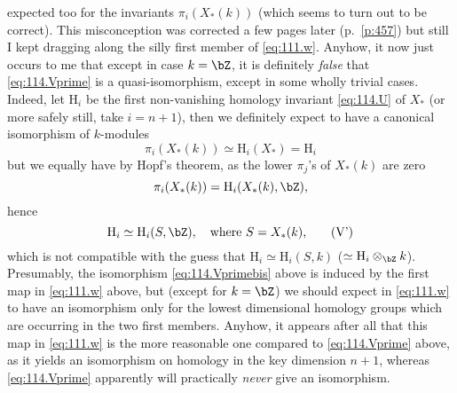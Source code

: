 expected too for the invariants $\pi_i(X_*(k))$ (which seems to turn
out to be correct). This misconception was corrected a few pages later
(p.~\ref{p:457}) but still I kept dragging along the silly first
member of \eqref{eq:111.w}. Anyhow, it now just occurs to me that
except in case $k=\bZ$, it is definitely \emph{false} that
\eqref{eq:114.Vprime} is a quasi-isomorphism, except in some wholly
trivial cases. Indeed, let $\mathrm H_i$ be the first non-vanishing
homology invariant \eqref{eq:114.U} of $X_*$ (or more safely still,
take $i=n+1$), then we definitely expect to have a canonical
isomorphism of $k$-modules
\begin{equation}
  \label{eq:114.Vbis}
  \pi_i(X_*(k)) \simeq \mathrm H_i(X_*) = \mathrm H_i\tag{V}
\end{equation}
but we equally have by Hopf's theorem, as the lower $\pi_j$'s of
$X_*(k)$ are zero
\[\pi_i(X_*(k)) = \mathrm H_i(X_*(k),\bZ),\]
hence
\begin{equation}
  \label{eq:114.Vprimebis}
  \mathrm H_i \simeq \mathrm H_i(S,\bZ), \quad\text{where
    $S=X_*(k)$,}\tag{V'}
\end{equation}
which is not compatible with the guess that $\mathrm H_i\simeq\mathrm
H_i(S,k)$ ($\simeq\mathrm H_i\otimes_\bZ k$). Presumably, the
isomorphism \eqref{eq:114.Vprimebis} above is induced by the first map
in \eqref{eq:111.w} above, but (except for $k=\bZ$) we should expect
in \eqref{eq:111.w} to have an isomorphism only for the lowest
dimensional homology groups which are occurring in the two first
members. Anyhow, it appears after all that this map in
\eqref{eq:111.w} is the more reasonable one compared to
\eqref{eq:114.Vprime} above, as it yields an isomorphism on homology
in the key dimension $n+1$, whereas \eqref{eq:114.Vprime} apparently
will practically \emph{never} give an isomorphism.

